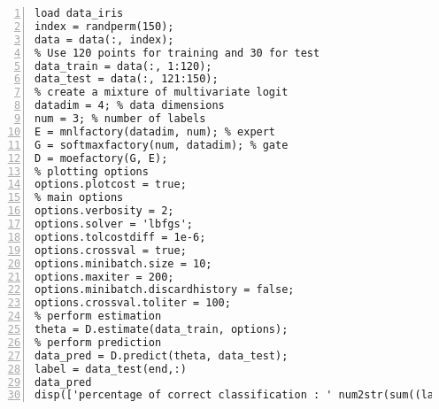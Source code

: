\begin{latin}
\begin{lstlisting}[frame=single,numbers=left,aboveskip={\baselineskip},belowskip={1.5\baselineskip}]
% load the iris data and randomly permute them
load data_iris
index = randperm(150);
data = data(:, index);
% Use 120 points for training and 30 for test
data_train = data(:, 1:120);
data_test = data(:, 121:150);
% create a mixture of multivariate logit
datadim = 4; % data dimensions
num = 3; % number of labels
E = mnlfactory(datadim, num); % expert
G = softmaxfactory(num, datadim); % gate
D = moefactory(G, E);
% plotting options
options.plotcost = true;
% main options
options.verbosity = 2;
options.solver = 'lbfgs';
options.tolcostdiff = 1e-6;
options.crossval = true;
options.minibatch.size = 10;
options.maxiter = 200;
options.minibatch.discardhistory = false;
options.crossval.toliter = 100;
% perform estimation
theta = D.estimate(data_train, options);
% perform prediction
data_pred = D.predict(theta, data_test);
label = data_test(end,:)
data_pred
disp(['percentage of correct classification : ' num2str(sum((label-data_pred)==0) * 100 /30)]);
\end{lstlisting}
\end{latin}




